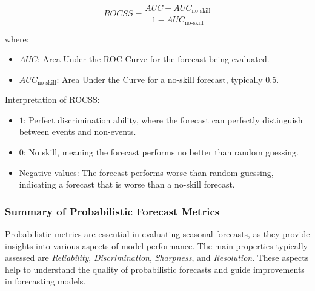 \[
ROCSS = \frac{AUC - AUC_{\text{no-skill}}}{1 - AUC_{\text{no-skill}}}
\]

where:  
\begin{itemize}
	\item \( AUC \): Area Under the ROC Curve for the forecast being evaluated.  
	\item \( AUC_{\text{no-skill}} \): Area Under the Curve for a no-skill forecast, typically 0.5.  
\end{itemize}

Interpretation of ROCSS:  
\begin{itemize}
	\item \( 1 \): Perfect discrimination ability, where the forecast can perfectly distinguish between events and non-events.  
	\item \( 0 \): No skill, meaning the forecast performs no better than random guessing.  
	\item Negative values: The forecast performs worse than random guessing, indicating a forecast that is worse than a no-skill forecast.  
\end{itemize}
\subsubsection{Summary of Probabilistic Forecast Metrics}

Probabilistic metrics are essential in evaluating seasonal forecasts, as they provide insights into various aspects of model performance. The main properties typically assessed are \textit{Reliability}, \textit{Discrimination}, \textit{Sharpness}, and \textit{Resolution}. These aspects help to understand the quality of probabilistic forecasts and guide improvements in forecasting models.

